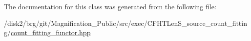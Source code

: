 The documentation for this class was generated from the following file\-:\begin{DoxyCompactItemize}
\item 
/disk2/brg/git/\-Magnification\-\_\-\-Public/src/exec/\-C\-F\-H\-T\-Len\-S\-\_\-source\-\_\-count\-\_\-fitting/\hyperlink{count__fitting__functor_8hpp}{count\-\_\-fitting\-\_\-functor.\-hpp}\end{DoxyCompactItemize}
